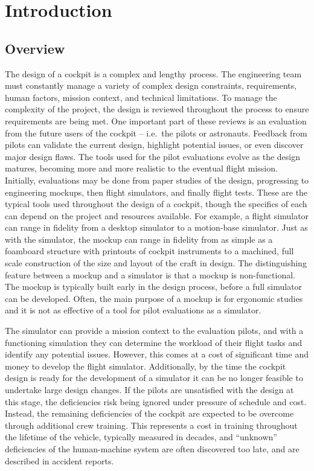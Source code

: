 \chapter{Introduction}


\section{Overview}
\label{sec:intro_overview}

The design of a cockpit is a complex and lengthy process.
The engineering team must constantly manage a variety of complex design constraints, requirements, human factors, mission context, and technical limitations.
To manage the complexity of the project, the design is reviewed throughout the process to ensure requirements are being met.
 One important part of these reviews is an evaluation from the future users of the cockpit -- i.e.\ the pilots or astronauts.
Feedback from pilots can validate the current design, highlight potential issues, or even discover major design flaws.
The tools used for the pilot evaluations evolve as the design matures, becoming more and more realistic to the eventual flight mission.
Initially, evaluations may be done from paper studies of the design, progressing to engineering mockups, then flight simulators, and finally flight tests.
These are the typical tools used throughout the design of a cockpit, though the specifics of each can depend on the project and resources available.
For example, a flight simulator can range in fidelity from a desktop simulator to a motion-base simulator.
Just as with the simulator, the mockup can range in fidelity from as simple as a foamboard structure with printouts of cockpit instruments to a machined, full scale construction of the size and layout of the craft in design.
The distinguishing feature between a mockup and a simulator is that a mockup is non-functional.
The mockup is typically built early in the design process, before a full simulator can be developed.
Often, the main purpose of a mockup is for ergonomic studies and it is not as effective of a tool for pilot evaluations as a simulator.

The simulator can provide a mission context to the evaluation pilots, and with a functioning simulation they can determine the workload of their flight tasks and identify any potential issues.
However, this comes at a cost of significant time and money to develop the flight simulator.
Additionally, by the time the cockpit design is ready for the development of a simulator it can be no longer feasible to undertake large design changes.
If the pilots are unsatisfied with the design at this stage, the deficiencies risk being ignored under pressure of schedule and cost.
Instead, the remaining deficiencies of the cockpit are expected to be overcome through additional crew training.
This represents a cost in training throughout the lifetime of the vehicle, typically measured in decades, and ``unknown'' deficiencies of the human-machine system are often discovered too late, and are described in accident reports.

